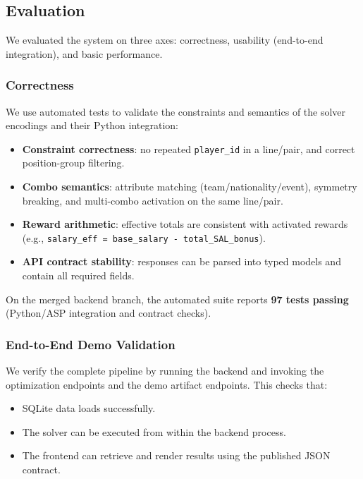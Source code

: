 \subsection{Evaluation}

We evaluated the system on three axes: correctness, usability (end-to-end integration), and basic performance.

\subsubsection{Correctness}
We use automated tests to validate the constraints and semantics of the solver encodings and their Python integration:
\begin{itemize}
    \item \textbf{Constraint correctness}: no repeated \texttt{player\_id} in a line/pair, and correct position-group filtering.
    \item \textbf{Combo semantics}: attribute matching (team/nationality/event), symmetry breaking, and multi-combo activation on the same line/pair.
    \item \textbf{Reward arithmetic}: effective totals are consistent with activated rewards (e.g., \texttt{salary\_eff = base\_salary - total\_SAL\_bonus}).
    \item \textbf{API contract stability}: responses can be parsed into typed models and contain all required fields.
\end{itemize}
On the merged backend branch, the automated suite reports \textbf{97 tests passing} (Python/ASP integration and contract checks).

\subsubsection{End-to-End Demo Validation}
We verify the complete pipeline by running the backend and invoking the optimization endpoints and the demo artifact endpoints. This checks that:
\begin{itemize}
    \item SQLite data loads successfully.
    \item The solver can be executed from within the backend process.
    \item The frontend can retrieve and render results using the published JSON contract.
\end{itemize}

